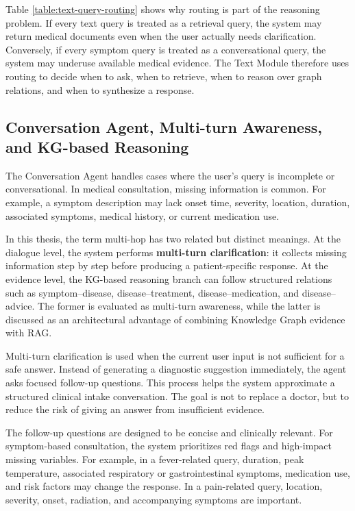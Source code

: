 Table \ref{table:text-query-routing} shows why routing is part of the reasoning problem. If every text query is treated as a retrieval query, the system may return medical documents even when the user actually needs clarification. Conversely, if every symptom query is treated as a conversational query, the system may underuse available medical evidence. The Text Module therefore uses routing to decide when to ask, when to retrieve, when to reason over graph relations, and when to synthesize a response.

\subsection{Conversation Agent, Multi-turn Awareness, and KG-based Reasoning}

The Conversation Agent handles cases where the user's query is incomplete or conversational. In medical consultation, missing information is common. For example, a symptom description may lack onset time, severity, location, duration, associated symptoms, medical history, or current medication use.

In this thesis, the term multi-hop has two related but distinct meanings. At the dialogue level, the system performs \textbf{multi-turn clarification}: it collects missing information step by step before producing a patient-specific response. At the evidence level, the KG-based reasoning branch can follow structured relations such as symptom--disease, disease--treatment, disease--medication, and disease--advice. The former is evaluated as multi-turn awareness, while the latter is discussed as an architectural advantage of combining Knowledge Graph evidence with RAG.

Multi-turn clarification is used when the current user input is not sufficient for a safe answer. Instead of generating a diagnostic suggestion immediately, the agent asks focused follow-up questions. This process helps the system approximate a structured clinical intake conversation. The goal is not to replace a doctor, but to reduce the risk of giving an answer from insufficient evidence.

The follow-up questions are designed to be concise and clinically relevant. For symptom-based consultation, the system prioritizes red flags and high-impact missing variables. For example, in a fever-related query, duration, peak temperature, associated respiratory or gastrointestinal symptoms, medication use, and risk factors may change the response. In a pain-related query, location, severity, onset, radiation, and accompanying symptoms are important.

